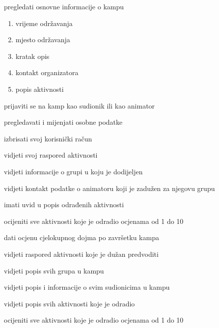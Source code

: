 \begin{packed_enum}
	\item  {}

	\begin{packed_enum}

		\item pregledati osnovne informacije o kampu
		\begin{enumerate}
			\item vrijeme održavanja
			\item mjesto održavanja
			\item kratak opis
			\item kontakt organizatora
			\item popis aktivnosti
		\end{enumerate}
		\item prijaviti se na kamp kao sudionik ili kao animator

	\end{packed_enum}
\vspace{10mm} %

	\item  {}

	\begin{packed_enum}

		\item pregledavati i mijenjati osobne podatke
		\item izbrisati svoj korisnički račun
		\item vidjeti svoj raspored aktivnosti
		\item vidjeti informacije o grupi u koju je dodijeljen
		\item vidjeti kontakt podatke o animatoru koji je zadužen za njegovu grupu
		\item imati uvid u popis odrađenih aktivnosti
		\item ocijeniti sve aktivnosti koje je odradio ocjenama od 1 do 10
		\item dati ocjenu cjelokupnog dojma po završetku kampa

	\end{packed_enum}
	\vspace{5mm} %

	\item  {}

	\begin{packed_enum}

		\item vidjeti raspored aktivnosti koje je dužan predvoditi
		\item vidjeti popis svih grupa u kampu
		\item vidjeti popis i informacije o svim sudionicima u kampu
		\item vidjeti popis svih aktivnosti koje je odradio
		\item ocijeniti sve aktivnosti koje je odradio ocjenama od 1 do 10


\end{packed_enum}
\end{packed_enum}
